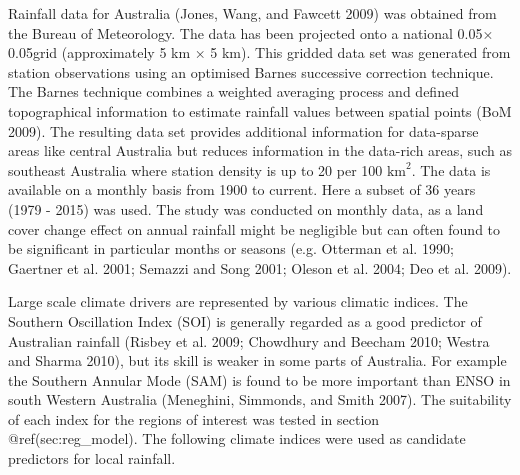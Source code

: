 \documentclass[]{elsarticle} %
\theoremstyle{definition}
\theoremstyle{definition}
\theoremstyle{definition}
\theoremstyle{remark}
\begin{document}
Rainfall data for Australia (Jones, Wang, and Fawcett 2009) was obtained
from the Bureau of Meteorology. The data has been projected onto a
national 0.05\textdegree × 0.05\textdegree grid (approximately 5 km × 5
km). This gridded data set was generated from station observations using
an optimised Barnes successive correction technique. The Barnes
technique combines a weighted averaging process and defined
topographical information to estimate rainfall values between spatial
points (BoM 2009). The resulting data set provides additional
information for data-sparse areas like central Australia but reduces
information in the data-rich areas, such as southeast Australia where
station density is up to 20 per 100 \(\text{km}^2\). The data is
available on a monthly basis from 1900 to current. Here a subset of 36
years (1979 - 2015) was used. The study was conducted on monthly data,
as a land cover change effect on annual rainfall might be negligible but
can often found to be significant in particular months or seasons (e.g.
Otterman et al. 1990; Gaertner et al. 2001; Semazzi and Song 2001;
Oleson et al. 2004; Deo et al. 2009).

Large scale climate drivers are represented by various climatic indices.
The Southern Oscillation Index (SOI) is generally regarded as a good
predictor of Australian rainfall (Risbey et al. 2009; Chowdhury and
Beecham 2010; Westra and Sharma 2010), but its skill is weaker in some
parts of Australia. For example the Southern Annular Mode (SAM) is found
to be more important than ENSO in south Western Australia (Meneghini,
Simmonds, and Smith 2007). The suitability of each index for the regions
of interest was tested in section @ref(sec:reg\_model). The following
climate indices were used as candidate predictors for local rainfall.
\end{document}
